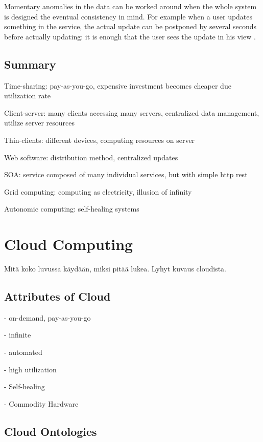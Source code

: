 \documentclass{tktltiki}
\begin{document}
Momentary anomalies in the data can be worked around when the whole system is designed the eventual consistency in mind.  For example when a user updates something in the service, the actual update can be postponed by several seconds before actually updating: it is enough that the user sees the update in his view \cite{Pri08}.



\subsection{Summary}

Time-sharing: pay-as-you-go, expensive investment becomes cheaper due utilization rate

Client-server: many clients accessing many servers, centralized data management, utilize server resources

Thin-clients: different devices, computing resources on server

Web software: distribution method, centralized updates

SOA: service composed of many individual services, but with simple http rest

Grid computing: computing as electricity, illusion of infinity

Autonomic computing: self-healing systems









\section{Cloud Computing}

Mitä koko luvussa käydään, miksi pitää lukea.  Lyhyt kuvaus cloudista.


\subsection{Attributes of Cloud}

- on-demand, pay-as-you-go

- infinite

- automated

- high utilization

- Self-healing

- Commodity Hardware


\subsection{Cloud Ontologies}
\end{document}
